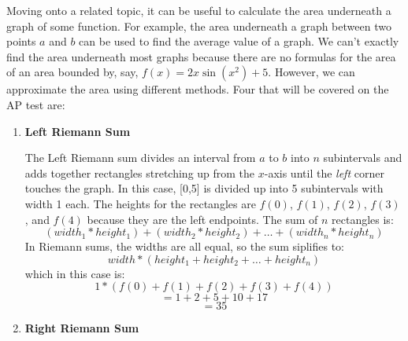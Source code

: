 \documentclass[../revisedmain.tex]{subfiles}
\begin{document}
Moving onto a related topic, it can be useful to calculate the area underneath a graph of some function. For example, the area underneath a graph between two points $a$ and $b$ can be used to find the average value of a graph. We can't exactly find the area underneath most graphs because there are no formulas for the area of an area bounded by, say, $f(x)=2x\sin(x^2)+5$. However, we can approximate the area using different methods. Four that will be covered on the AP test are:
\newpage
\begin{enumerate}
	\item \textbf{Left Riemann Sum}
	\begin{center}
	\end{center}
	The Left Riemann sum divides an interval from $a$ to $b$ into $n$ subintervals and adds together rectangles stretching up from the $x$-axis until the \textit{left} corner touches the graph. In this case, [0,5] is divided up into 5 subintervals with width 1 each. The heights for the rectangles are $f(0)$, $f(1)$, $f(2)$, $f(3)$, and $f(4)$ because they are the left endpoints. The sum of $n$ rectangles is:$$(width_1*height_1) + (width_2*height_2) + \dots +(width_n*height_n)$$ In Riemann sums, the widths are all equal, so the sum siplifies to:$$width*(height_1+height_2+\dots+height_n)$$ which in this case is:$$1*\left(f(0)+f(1)+f(2)+f(3)+f(4)\right)$$$$=1+2+5+10+17$$$$=35$$
	\newpage
	\item \textbf{Right Riemann Sum}
		\begin{center}
\end{center}
\end{enumerate}
\end{document}
